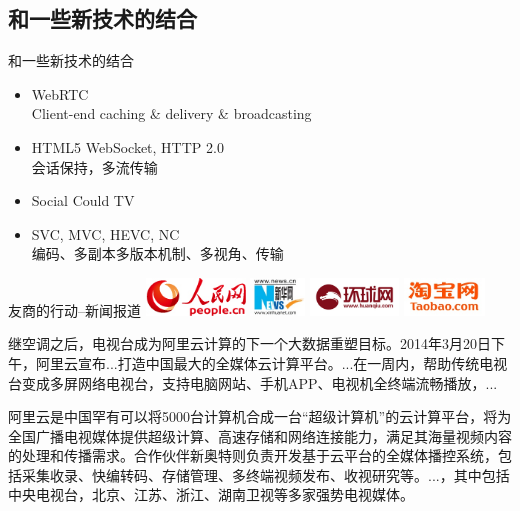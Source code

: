 \documentclass{beamer}
\begin{document}
\subsection{和一些新技术的结合}
\begin{frame}{和一些新技术的结合}
\begin{itemize}
\item WebRTC\\
Client-end caching \& delivery \& broadcasting
\item HTML5 WebSocket, HTTP 2.0\\
会话保持，多流传输
\item Social Could TV\\
\item SVC, MVC, HEVC, NC\\
编码、多副本多版本机制、多视角、传输
\end{itemize}
\end{frame}
\begin{frame}{友商的行动--新闻报道}
\includegraphics[height=1.0cm]{fig/rmw_logo.jpg}
\includegraphics[height=1.0cm]{fig/xinhua_logo.jpg}
\includegraphics[height=1.0cm]{fig/huanqiu_logo.jpg}
\includegraphics[height=1.0cm]{fig/taobao_logo.jpg}\\\pause
\small{
继空调之后，电视台成为阿里云计算的下一个大数据重塑目标。2014年3月20日下午，阿里云宣布...打造中国最大的全媒体云计算平台。...在一周内，帮助传统电视台变成多屏网络电视台，支持电脑网站、手机APP、电视机全终端流畅播放，...

阿里云是中国罕有可以将5000台计算机合成一台“超级计算机”的云计算平台，将为全国广播电视媒体提供超级计算、高速存储和网络连接能力，满足其海量视频内容的处理和传播需求。合作伙伴新奥特则负责开发基于云平台的全媒体播控系统，包括采集收录、快编转码、存储管理、多终端视频发布、收视研究等。...，其中包括中央电视台，北京、江苏、浙江、湖南卫视等多家强势电视媒体。
}
\end{frame}
\end{document}

